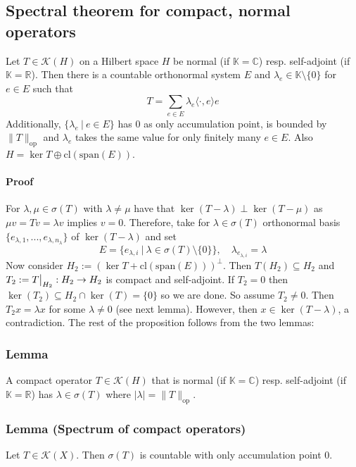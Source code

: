 \documentclass{scrartcl}
\newcommand{\R}{\mathbb{R}}
\newcommand{\C}{\mathbb{C}}
\newcommand\restr[2]{{
    \left.\kern-\nulldelimiterspace
    #1
    \vphantom{\big|}
    \right|_{#2}
}}
\begin{document}
\subsection{Spectral theorem for compact, normal operators}
\label{spectral_theorem_operator}
Let $T \in \mathcal{K}(H)$ on a Hilbert space $H$ be normal (if $\mathbb{K} = \C$) resp. self-adjoint (if $\mathbb{K} = \R$). Then there is a countable orthonormal system $E$ and $\lambda_e \in \mathbb{K} \setminus \{0\}$ for $e \in E$ such that
\begin{equation*}
    T = \sum_{e \in E} \lambda_e \langle \cdot, e \rangle e
\end{equation*}
Additionally, $\{ \lambda_e \ | \ e \in E \}$ has $0$ as only accumulation point, is bounded by $\| T \|_{\mathrm{op}}$ and $\lambda_e$ takes the same value for only finitely many $e \in E$. Also $H = \ker T \oplus \mathrm{cl}(\mathrm{span}(E))$.
\paragraph{Proof} For $\lambda, \mu \in \sigma(T)$ with $\lambda \neq \mu$ have that $\ker(T - \lambda) \perp \ker(T - \mu)$ as $\mu v = T v = \lambda v$ implies $v = 0$. Therefore, take for $\lambda \in \sigma(T)$ orthonormal basis $\{ e_{\lambda, 1}, ..., e_{\lambda, n_\lambda} \}$ of $\ker(T - \lambda)$ and set
\begin{equation*}
    E = \{ e_{\lambda, i} \ | \ \lambda \in \sigma(T) \setminus \{0\} \}, \quad \lambda_{e_{\lambda, i}} = \lambda
\end{equation*}
Now consider $H_2 := (\ker T + \mathrm{cl}(\mathrm{span}(E)))^\perp$. Then $T(H_2) \subseteq H_2$ and $T_2 := \restr{T}{H_2}: H_2 \to H_2$ is compact and self-adjoint. If $T_2 = 0$ then $\ker(T_2) \subseteq H_2 \cap \ker(T) = \{0\}$ so we are done. 
So assume $T_2 \neq 0$. Then $T_2x = \lambda x$ for some $\lambda \neq 0$ (see next lemma). However, then $x \in \ker(T - \lambda)$, a contradiction.
The rest of the proposition follows from the two lemmas:

\subsubsection{Lemma}
A compact operator $T \in \mathcal{K}(H)$ that is normal (if $\mathbb{K} = \C$) resp. self-adjoint (if $\mathbb{K} = \R$) has $\lambda \in \sigma(T)$ where $|\lambda| = \| T \|_{\mathrm{op}}$.

\subsubsection{Lemma (Spectrum of compact operators)}
Let $T \in \mathcal{K}(X)$. Then $\sigma(T)$ is countable with only accumulation point $0$.
\end{document}
